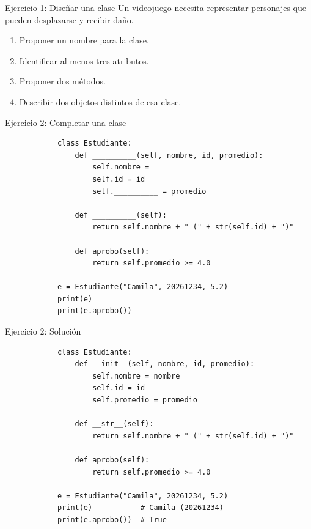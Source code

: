 \documentclass{beamer}
\begin{document}
    \begin{frame}{Ejercicio 1: Diseñar una clase}
        Un videojuego necesita representar personajes que pueden desplazarse y recibir daño.
        
        \begin{enumerate}
            \item Proponer un nombre para la clase.
            \item Identificar al menos tres atributos.
            \item Proponer dos métodos.
            \item Describir dos objetos distintos de esa clase.
        \end{enumerate}
    \end{frame}
    
    \begin{frame}[fragile,t]{Ejercicio 2: Completar una clase}
        \begin{verbatim}
            class Estudiante:
                def __________(self, nombre, id, promedio):
                    self.nombre = __________
                    self.id = id
                    self.__________ = promedio
            
                def __________(self):
                    return self.nombre + " (" + str(self.id) + ")"
            
                def aprobo(self):
                    return self.promedio >= 4.0
            
            e = Estudiante("Camila", 20261234, 5.2)
            print(e)
            print(e.aprobo())
        \end{verbatim}
    \end{frame}
    
    \begin{frame}[fragile,t]{Ejercicio 2: Solución}
        \begin{verbatim}
            class Estudiante:
                def __init__(self, nombre, id, promedio):
                    self.nombre = nombre
                    self.id = id
                    self.promedio = promedio
            
                def __str__(self):
                    return self.nombre + " (" + str(self.id) + ")"
            
                def aprobo(self):
                    return self.promedio >= 4.0
            
            e = Estudiante("Camila", 20261234, 5.2)
            print(e)           # Camila (20261234)
            print(e.aprobo())  # True
        \end{verbatim}
    \end{frame}
    
\end{document}
